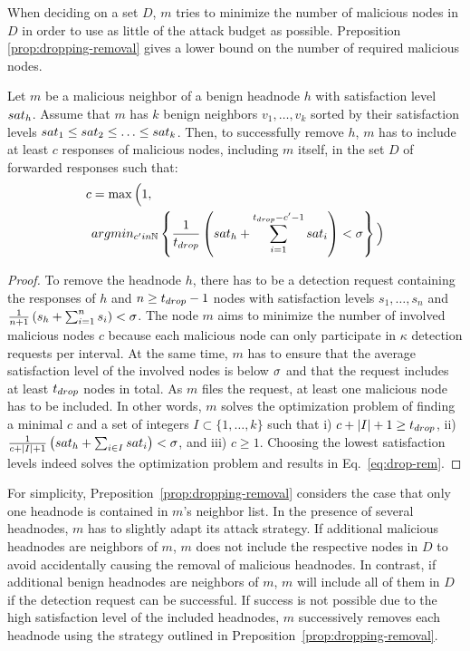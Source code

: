 When deciding on a set $D$, $m$ tries to minimize the number of malicious nodes in $D$ in order to use as little of the attack budget as possible. 
Preposition \ref{prop:dropping-removal} gives a lower bound on the number of required malicious nodes. 


  
 

\begin{proposition}
\label{prop:dropping-removal}
Let $m$ be a malicious neighbor of a benign headnode $h$ with satisfaction level $sat_h$. Assume that $m$ has $k$ benign neighbors $v_1, \ldots , v_k$ sorted by their satisfaction levels $sat_1 \leq sat_2 \leq \ldots  \leq sat_k$. 
Then, to successfully remove $h$, $m$ has to include at least $c$ responses of malicious nodes, including $m$ itself, in the set $D$ of forwarded responses such that:
\begin{align}
\label{eq:drop-rem}
c &= \max \Big( 1,  \\
 & argmin_{c' in \mathbb{N}} 
\left\lbrace \frac{1}{\minP}\left(\sat_h+\sum_{i=1}^{\minP-c'-1}\sat_i \right) < \satThres \right\rbrace 
\Big) \nonumber 
\end{align}
\end{proposition}
\begin{proof}
To remove the headnode $h$, there has to be a detection request containing the responses of $h$ and $n\geq t_{drop}-1$ nodes with satisfaction levels $s_1, \ldots , s_n$ and 
$\frac{1}{n+1}\left( s_h + \sum_{i=1}^{n}s_i \right) < \sigma$.
The node $m$ aims to minimize the number of involved malicious nodes $c$ because each malicious node can only participate in $\kappa$ detection requests per interval. At the same time, $m$ has to ensure that the average satisfaction level of the involved nodes is below $\sigma$ and that the request includes at least $t_{drop}$ nodes in total. As $m$ files the request, at least one malicious node has to be included. 
In other words, $m$ solves the optimization problem of finding a minimal $c$ and a set of integers $I \subset \{1, \ldots, k\}$ such that i) $c + |I|+1 \geq t_{drop}$, ii) $\frac{1}{c + |I|+1}\left( sat_h + \sum_{i \in I} sat_i \right) < \sigma$, and iii) $c\geq 1$. 
Choosing the lowest satisfaction levels indeed solves the optimization problem and results in Eq.~\ref{eq:drop-rem}. 
\end{proof}

For simplicity, Preposition~\ref{prop:dropping-removal} considers the case that only one headnode is contained in $m$'s neighbor list. In the presence of several headnodes, $m$ has to slightly adapt its attack strategy. 
If additional malicious headnodes are neighbors of $m$, $m$ does not include the respective nodes in $D$ to avoid accidentally causing the removal of malicious headnodes.  In contrast, if additional benign headnodes are neighbors of $m$, $m$ will include all of them in $D$ if the detection request can be successful. If success is not possible due to the high satisfaction level of the included headnodes, $m$ successively removes each headnode using the strategy outlined in Preposition~\ref{prop:dropping-removal}. 


